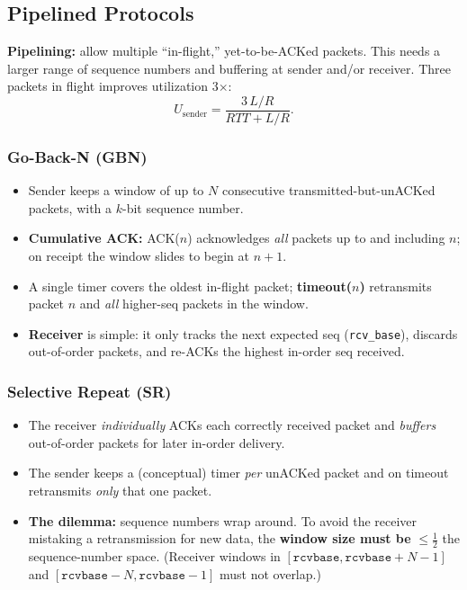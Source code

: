 \documentclass[hidelinks]{article}
\begin{document}
\subsection{Pipelined Protocols}

\textbf{Pipelining:} allow multiple ``in-flight,'' yet-to-be-ACKed packets.
This needs a larger range of sequence numbers and buffering at sender and/or
receiver. Three packets in flight improves utilization 3$\times$:
\[
    U_{\text{sender}} = \frac{3\,L/R}{RTT + L/R}.
\]

\subsubsection{Go-Back-N (GBN)}
\begin{itemize}
    \item Sender keeps a window of up to $N$ consecutive transmitted-but-unACKed
    packets, with a $k$-bit sequence number.
    \item \textbf{Cumulative ACK:} ACK($n$) acknowledges \emph{all} packets up
    to and including $n$; on receipt the window slides to begin at $n+1$.
    \item A single timer covers the oldest in-flight packet;
    \textbf{timeout($n$)} retransmits packet $n$ and \emph{all} higher-seq
    packets in the window.
    \item \textbf{Receiver} is simple: it only tracks the next expected seq
    (\texttt{rcv\_base}), discards out-of-order packets, and re-ACKs the
    highest in-order seq received.
\end{itemize}

\subsubsection{Selective Repeat (SR)}
\begin{itemize}
    \item The receiver \emph{individually} ACKs each correctly received packet
    and \emph{buffers} out-of-order packets for later in-order delivery.
    \item The sender keeps a (conceptual) timer \emph{per} unACKed packet and
    on timeout retransmits \emph{only} that one packet.
    \item \textbf{The dilemma:} sequence numbers wrap around. To avoid the
    receiver mistaking a retransmission for new data, the
    \textbf{window size must be} $\leq \tfrac{1}{2}$ the sequence-number
    space. (Receiver windows in $[\texttt{rcvbase}, \texttt{rcvbase}+N-1]$ and
    $[\texttt{rcvbase}-N, \texttt{rcvbase}-1]$ must not overlap.)
\end{itemize}
\end{document}
